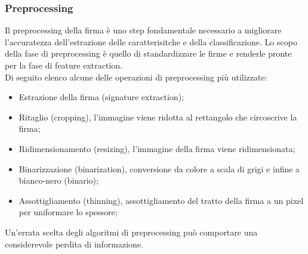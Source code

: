 \subsubsection*{Preprocessing}
\label{2.1.3.1}
Il preprocessing della firma è uno step fondamentale necessario a migliorare l'accuratezza dell'estrazione delle caratterisitche e della classificazione. Lo scopo della fase di preprocessing è quello di standardizzare le firme e renderle pronte per la fase di feature extraction.\\ Di seguito elenco alcune delle operazioni di preprocessing più utilizzate:
\begin{itemize}
\item Estrazione della firma (signature extraction);
\item Ritaglio (cropping), l'immagine viene ridotta al rettangolo che circoscrive la firma;
\item Ridimensionamento (resizing), l'immagine della firma viene ridimensionata;
\item Binarizzazione (binarization), conversione da colore a scala di grigi e infine a bianco-nero (binario);
\item Assottigliamento (thinning), assottigliamento del tratto della firma a un pixel per uniformare lo spessore;
\end{itemize}
Un'errata scelta degli algoritmi di preprocessing può comportare una considerevole perdita di informazione.

